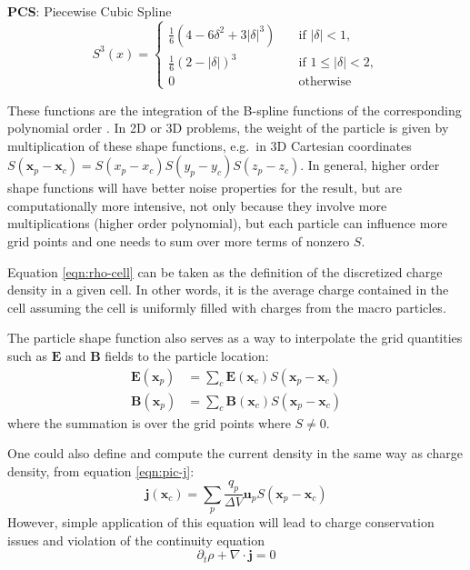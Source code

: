 \textbf{PCS}: Piecewise Cubic Spline
\begin{equation}
  \label{eq:third-order-deposit}
  S^3(x) =
  \begin{cases}
    \displaystyle \frac{1}{6} \left( 4 - 6\delta^2 + 3|\delta|^3 \right) & \quad \text{if } |\delta| < 1, \\
    \displaystyle \frac{1}{6} \left( 2 - |\delta| \right)^3 & \quad \text{if } 1 \leq |\delta| < 2, \\
    \displaystyle 0                      & \quad \text{otherwise}
  \end{cases}
\end{equation}

These functions are the integration of the B-spline functions of the
corresponding polynomial order \citep{haugboelle_photon-plasma:_2012}.
In 2D or 3D problems, the weight of the particle is given by multiplication of
these shape functions, e.g.\ in 3D Cartesian coordinates $S(\mathbf{x}_{p} -
\mathbf{x}_{c}) = S(x_{p} - x_{c})S(y_{p} - y_{c})S(z_{p} - z_{c})$. In general,
higher order shape functions will have better noise properties for the result,
but are computationally more intensive, not only because they involve more
multiplications (higher order polynomial), but each particle can influence more
grid points and one needs to sum over more terms of nonzero $S$.

Equation \eqref{eqn:rho-cell} can be taken as the definition of the discretized
charge density in a given cell. In other words, it is the average charge
contained in the cell assuming the cell is uniformly filled with charges from
the macro particles.

The particle shape function also serves as a way to interpolate the grid
quantities such as $\mathbf{E}$ and $\mathbf{B}$ fields to the particle
location:
\begin{align}
    \label{eqn:interpolate}
    \mathbf{E}(\mathbf{x}_p) &= \sum_c \mathbf{E}(\mathbf{x}_c) S(\mathbf{x}_p - \mathbf{x}_c) \\
    \mathbf{B}(\mathbf{x}_p) &= \sum_c \mathbf{B}(\mathbf{x}_c) S(\mathbf{x}_p - \mathbf{x}_c)
\end{align}
where the summation is over the grid points where $S \neq 0$.

One could also define and compute the current density in the same way as charge density,
from equation \eqref{eqn:pic-j}:
\begin{equation}
  \label{eq:naive-j}
  \mathbf{j} ( \mathbf{x}_{c} ) = \sum_{p} \frac{q_{p}}{\Delta V}\mathbf{u}_p S (
  \mathbf{x}_{p} -\mathbf{x}_{c} )
\end{equation}
However, simple application of this equation will lead to charge
conservation issues and violation of the continuity equation \citetext{see e.g.\
  \citealp{hockney_computer_1981}, \citealp{birdsall_plasma_1991}}
\begin{equation}
    \label{eq:continuity}
    \partial_t\rho + \nabla\cdot \mathbf{j} = 0
\end{equation}

